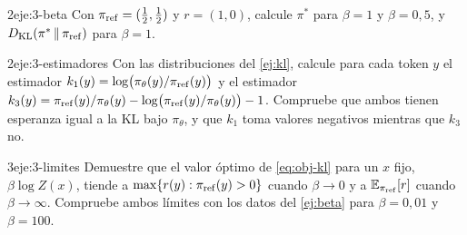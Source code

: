 \begin{ejercicio}{2}{eje:3-beta}
Con $\pi_{\mathrm{ref}}=(\tfrac12,\tfrac12)$ y $r=(1,0)$, calcule $\pi^{*}$ para $\beta=1$ y $\beta=0{,}5$, y $D_{\mathrm{KL}}(\pi^{*}\,\|\,\pi_{\mathrm{ref}})$ para $\beta=1$.
\end{ejercicio}

\begin{ejercicio}{2}{eje:3-estimadores}
Con las distribuciones del \cref{ej:kl}, calcule para cada token $y$ el estimador $k_1(y)=\log\bigl(\pi_\theta(y)/\pi_{\mathrm{ref}}(y)\bigr)$ y el estimador $k_3(y)=\pi_{\mathrm{ref}}(y)/\pi_\theta(y)-\log\bigl(\pi_{\mathrm{ref}}(y)/\pi_\theta(y)\bigr)-1$. Compruebe que ambos tienen esperanza igual a la KL bajo $\pi_\theta$, y que $k_1$ toma valores negativos mientras que $k_3$ no.
\end{ejercicio}

\begin{ejercicio}{3}{eje:3-limites}
Demuestre que el valor óptimo de \eqref{eq:obj-kl} para un $x$ fijo, $\beta\log Z(x)$, tiende a $\max\{r(y):\pi_{\mathrm{ref}}(y)>0\}$ cuando $\beta\to 0$ y a $\mathbb{E}_{\pi_{\mathrm{ref}}}[r]$ cuando $\beta\to\infty$. Compruebe ambos límites con los datos del \cref{ej:beta} para $\beta=0{,}01$ y $\beta=100$.
\end{ejercicio}
